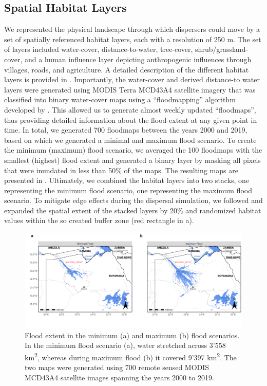 \documentclass[abstract=on,10pt,a4paper,bibliography=totocnumbered]{article}
\begin{document}
\subsection{Spatial Habitat Layers}
We represented the physical landscape through which dispersers could move by a
set of spatially referenced habitat layers, each with a resolution of 250 m. The
set of layers included water-cover, distance-to-water, tree-cover,
shrub/grassland-cover, and a human influence layer depicting anthropogenic
influences through villages, roads, and agriculture. A detailed description of
the different habitat layers is provided in \citep{Hofmann.2021}. Importantly,
the water-cover and derived distance-to water layers were generated using MODIS
Terra MCD43A4 satellite imagery that was classified into binary water-cover maps
using a ``floodmapping'' algorithm developed by \citep{Wolski.2017}. This
allowed us to generate almost weekly updated ``floodmaps'', thus providing
detailed information about the flood-extent at any given point in time. In
total, we generated 700 floodmaps between the years 2000 and 2019, based on
which we generated a minimal and maximum flood scenario. To create the minimum
(maximum) flood scenario, we averaged the 100 floodmaps with the smallest
(highest) flood extent and generated a binary layer by masking all pixels that
were inundated in less than 50\% of the maps. The resulting maps are presented
in . Ultimately, we combined the habitat layers into two
stacks, one representing the minimum flood scenario, one representing the
maximum flood scenario. To mitigate edge effects during the dispersal
simulation, we followed \cite{Koen.2010} and expanded the spatial extent of the
stacked layers by 20\% and randomized habitat values within the so created
buffer zone (red rectangle in a).

\begin{figure}
 \begin{center}
  \includegraphics[width = \textwidth]{99_FloodExtent.png}
  \caption{Flood extent in the minimum (a) and maximum (b) flood scenarios. In
   the minimum flood scenario (a), water stretched across 3'558
   km\textsuperscript{2}, whereas during maximum flood (b) it covered 9'397
   km\textsuperscript{2}. The two maps were generated using 700 remote sensed
   MODIS MCD43A4 satellite images spanning the years 2000 to 2019.}
  \label{FloodExtent}
 \end{center}
\end{figure}
\end{document}
